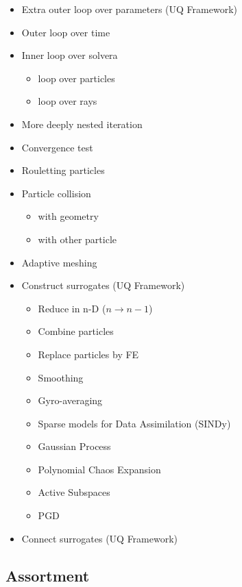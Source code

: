 \begin{itemize}
\item
  Extra outer loop over parameters (UQ Framework)
\item
  Outer loop over time
\item
  Inner loop over solvera

  \begin{itemize}
  \item
    loop over particles
  \item
    loop over rays
  \end{itemize}
\item
  More deeply nested iteration
\item
  Convergence test
\item
  Rouletting particles
\item
  Particle collision

  \begin{itemize}
  \item
    with geometry
  \item
    with other particle
  \end{itemize}
\item
  Adaptive meshing
\item
  Construct surrogates (UQ Framework)

  \begin{itemize}
  \item
    Reduce in n-D (\(n \rightarrow n-1\))
  \item
    Combine particles
  \item
    Replace particles by FE
  \item
    Smoothing
  \item
    Gyro-averaging
  \item
    Sparse models for Data Assimilation (SINDy)
  \item
    Gaussian Process
  \item
    Polynomial Chaos Expansion
  \item
    Active Subspaces
  \item
    PGD
  \end{itemize}
\item
  Connect surrogates (UQ Framework)
\end{itemize}

\subsection{Assortment}\label{sec:assortment}

